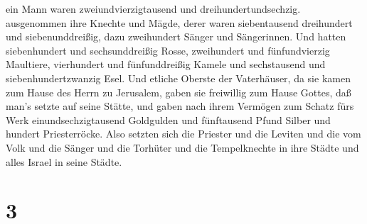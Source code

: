 ein Mann waren zweiundvierzigtausend und dreihundertundsechzig.
 ausgenommen ihre Knechte und Mägde, derer waren
siebentausend dreihundert und siebenunddreißig, dazu zweihundert Sänger
und Sängerinnen.  Und hatten siebenhundert und
sechsunddreißig Rosse, zweihundert und fünfundvierzig Maultiere,
 vierhundert und fünfunddreißig Kamele und sechstausend und
siebenhundertzwanzig Esel.  Und etliche Oberste der
Vaterhäuser, da sie kamen zum Hause des Herrn zu Jerusalem, gaben sie
freiwillig zum Hause Gottes, daß man's setzte auf seine Stätte,
 und gaben nach ihrem Vermögen zum Schatz fürs Werk
einundsechzigtausend Goldgulden und fünftausend Pfund Silber und hundert
Priesterröcke.  Also setzten sich die Priester und die
Leviten und die vom Volk und die Sänger und die Torhüter und die
Tempelknechte in ihre Städte und alles Israel in seine Städte.

\hypertarget{section-2}{%
\section{3}\label{section-2}}

